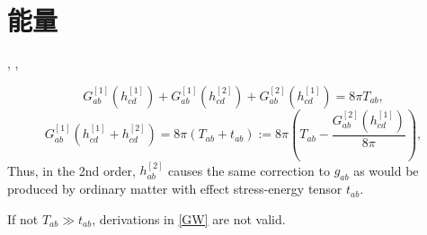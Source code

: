 \chapter{能量}

\cite{Wald1984}, \cite{Roy2020},

\begin{equation}
    G_{ab}^{[1]}(h_{cd}^{[1]})+G_{ab}^{[1]}(h_{cd}^{[2]})+G_{ab}^{[2]}(h_{cd}^{[1]})=8\pi T_{ab},
\end{equation}
\begin{equation}
    G_{ab}^{[1]}(h_{cd}^{[1]}+h_{cd}^{[2]})=8\pi (T_{ab}+t_{ab}):=8\pi (T_{ab}-\frac{G_{ab}^{[2]}(h_{cd}^{[1]})}{8\pi}),
\end{equation}
Thus, in the 2nd order, $h_{ab}^{[2]}$ causes the same correction to $g_{ab}$ as would be produced by ordinary matter with effect stress-energy tensor $t_{ab}$.

If not $T_{ab}\gg t_{ab}$, derivations in \ref{GW} are not valid.

